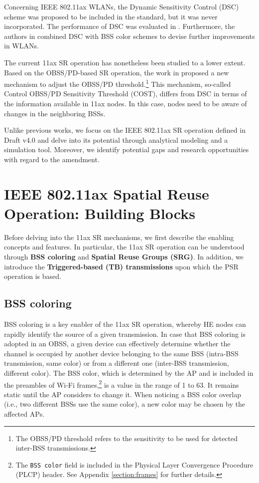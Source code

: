 \documentclass{article}
\begin{document}
Concerning IEEE 802.11ax WLANs, the Dynamic Sensitivity Control (DSC) scheme was proposed to be included in the standard, but it was never incorporated. The performance of DSC was evaluated in \cite{afaqui2015evaluation, afaqui2016dynamic, kulkarni2015taming}. Furthermore, the authors in \cite{selinis2016evaluation, selinis2017exploiting} combined DSC with BSS color schemes to devise further improvements in WLANs.

The current 11ax SR operation has nonetheless been studied to a lower extent. Based on the OBSS/PD-based SR operation, the work in \cite{selinis2018control} proposed a new mechanism to adjust the OBSS/PD threshold.\footnote{The OBSS/PD threshold refers to the sensitivity to be used for detected inter-BSS transmissions.} This mechanism, so-called Control OBSS/PD Sensitivity Threshold (COST), differs from DSC in terms of the information available in 11ax nodes. In this case, nodes need to be aware of changes in the neighboring BSSs. 

Unlike previous works, we focus on the IEEE 802.11ax SR operation defined in Draft v4.0 and delve into its potential through analytical modeling and a simulation tool. Moreover, we identify potential gaps and research opportunities with regard to the amendment.

\section{IEEE 802.11ax Spatial Reuse Operation: Building Blocks}
\label{section:enablers_sr_11ax}
Before delving into the 11ax SR mechanisms, we first describe the enabling concepts and features. In particular, the 11ax SR operation can be understood through \textbf{BSS coloring} and \textbf{Spatial Reuse Groups (SRG)}. In addition, we introduce the \textbf{Triggered-based (TB) transmissions} upon which the PSR operation is based.

\subsection{BSS coloring}	
\label{section:bss_coloring}	
BSS coloring is a key enabler of the 11ax SR operation, whereby HE nodes can rapidly identify the source of a given transmission. In case that BSS coloring is adopted in an OBSS, a given device can effectively determine whether the channel is occupied by another device belonging to the same BSS (intra-BSS transmission, same color) or from a different one (inter-BSS transmission, different color). The BSS color, which is determined by the AP and is included in the preambles of Wi-Fi frames,\footnote{The \texttt{BSS color} field is included in the Physical Layer Convergence Procedure (PLCP) header. See Appendix \ref{section:frames} for further details.} is a value in the range of 1 to 63. It remains static until the AP considers to change it. When noticing a BSS color overlap (i.e., two different BSSs use the same color), a new color may be chosen by the affected APs. 
\end{document}
